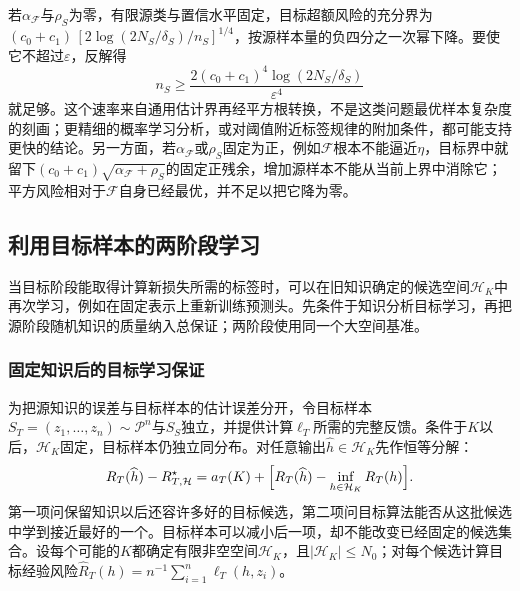 若$\alpha_{\mathcal F}$与$\rho_S$为零，有限源类与置信水平固定，目标超额风险的充分界为$(c_0+c_1)\,[2\log(2N_S/\delta_S)/n_S]^{1/4}$，按源样本量的负四分之一次幂下降。要使它不超过$\varepsilon$，反解得
\[
 n_S\geq\frac{2(c_0+c_1)^4\log(2N_S/\delta_S)}{\varepsilon^4}
\]
就足够。这个速率来自通用估计界再经平方根转换，不是这类问题最优样本复杂度的刻画；更精细的概率学习分析，或对阈值附近标签规律的附加条件，都可能支持更快的结论。另一方面，若$\alpha_{\mathcal F}$或$\rho_S$固定为正，例如$\mathcal F$根本不能逼近$\eta$，目标界中就留下$(c_0+c_1)\sqrt{\alpha_{\mathcal F}+\rho_S}$的固定正残余，增加源样本不能从当前上界中消除它；平方风险相对于$\mathcal F$自身已经最优，并不足以把它降为零。
\subsection{利用目标样本的两阶段学习}
\label{sec:task-two-stage}

当目标阶段能取得计算新损失所需的标签时，可以在旧知识确定的候选空间$\mathcal H_K$中再次学习，例如在固定表示上重新训练预测头。先条件于知识分析目标学习，再把源阶段随机知识的质量纳入总保证；两阶段使用同一个大空间基准。

\subsubsection{固定知识后的目标学习保证}

为把源知识的误差与目标样本的估计误差分开，令目标样本$S_T=(z_1,\ldots,z_n)\sim\mathcal P^n$与$S_S$独立，并提供计算$\ell_T$所需的完整反馈。条件于$K$以后，$\mathcal H_K$固定，目标样本仍独立同分布。对任意输出$\widehat h\in\mathcal H_K$先作恒等分解：
\[
 R_T(\widehat h)-R_{T,\mathcal H}^{\star}
 =a_T(K)+\Bigl[R_T(\widehat h)-\inf_{h\in\mathcal H_K}R_T(h)\Bigr].
\]
第一项问保留知识以后还容许多好的目标候选，第二项问目标算法能否从这批候选中学到接近最好的一个。目标样本可以减小后一项，却不能改变已经固定的候选集合。设每个可能的$K$都确定有限非空空间$\mathcal H_K$，且$|\mathcal H_K|\leq N_0$；对每个候选计算目标经验风险$\widehat R_T(h)=n^{-1}\sum_{i=1}^n\ell_T(h,z_i)$。

